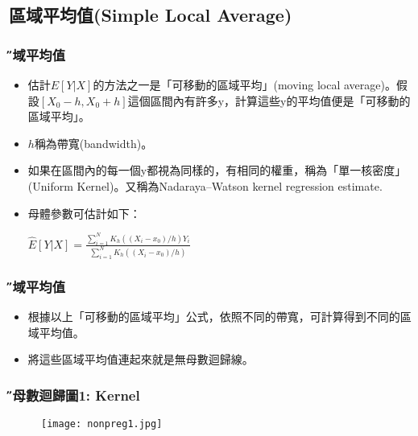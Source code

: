 \documentclass[xcolor=dvipsnames]{beamer}
\begin{document}
\subsection{區域平均值(Simple Local Average)}
\begin{frame}\frametitle{\H 區域平均值}
\begin{itemize}
\item 估計$E[Y|X]$的方法之一是「可移動的區域平均」(moving local average)。假設$[X_{0}-h,X_{0}+h]$這個區間內有許多y，計算這些y的平均值便是「可移動的區域平均」。
\item $h$稱為帶寬(bandwidth)。
\item 如果在區間內的每一個y都視為同樣的，有相同的權重，稱為「單一核密度」(Uniform Kernel)。又稱為Nadaraya–Watson kernel regression estimate.
\item 母體參數可估計如下：
\begin{center}
$\hat{E}[Y|X]=\frac{\sum_{i=1}^N K_{h}((X_{i}-x_{0})/h)Y_{i}}{\sum_{i=1}^N K_{h}((X_{i}-x_{0})/h)}$
\end{center}
\end{itemize}
\end{frame}
\begin{frame}\frametitle{\H 區域平均值}
\begin{itemize}
\item 根據以上「可移動的區域平均」公式，依照不同的帶寬，可計算得到不同的區域平均值。
\item 將這些區域平均值連起來就是無母數迴歸線。

\end{itemize}
\end{frame}
\begin{frame}\frametitle{\H 無母數迴歸圖1: Kernel}
\begin{figure}
\begin{center}
\texttt{[image: nonpreg1.jpg]}
\end{center}
\end{figure}
\end{frame}
\end{document}
